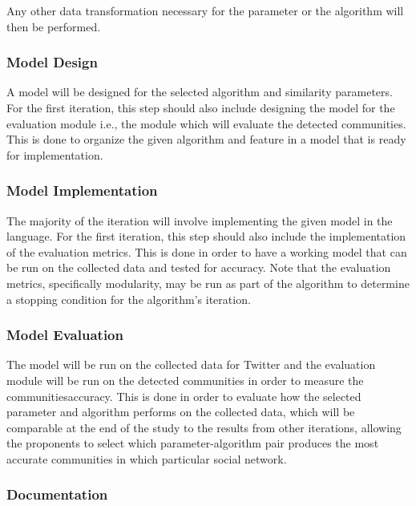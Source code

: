 Any other data transformation necessary for the parameter or the algorithm will then be performed.




\subsubsection{Model Design}




A model will be designed for the selected algorithm and similarity parameters. For the first iteration, this step should also include designing the model for the evaluation module i.e., the module which will evaluate the detected communities. This is done to organize the given algorithm and feature in a model that is ready for implementation.




\subsubsection{Model Implementation}




The majority of the iteration will involve implementing the given model in the language. For the first iteration, this step should also include the implementation of the evaluation metrics. This is done in order to have a working model that can be run on the collected data and tested for accuracy. Note that the evaluation metrics, specifically modularity, may be run as part of the algorithm to determine a stopping condition for the algorithm’s iteration.




\subsubsection{Model Evaluation}




The model will be run on the collected data for Twitter and the evaluation module will be run on the detected communities in order to measure the communities\vtick accuracy. This is done in order to evaluate how the selected parameter and algorithm performs on the collected data, which will be comparable at the end of the study to the results from other iterations, allowing the proponents to select which parameter-algorithm pair produces the most accurate communities in which particular social network.




\subsubsection{Documentation}




